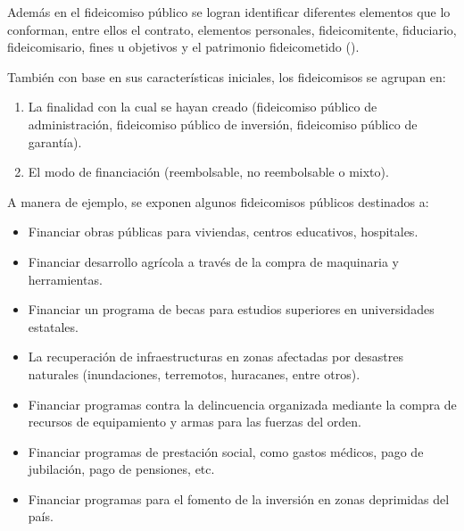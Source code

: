 \documentclass[preprint,floatfix] {revtex4}
\begin{document}
            Además en el fideicomiso público se logran identificar diferentes elementos que lo conforman, entre ellos el contrato, elementos personales, fideicomitente, fiduciario, fideicomisario, fines u objetivos y el patrimonio fideicometido (\cite{fideicomisopublico-victoria}).
            
            También con base en sus características iniciales, los fideicomisos se agrupan en:
            \begin{enumerate}
                \item La finalidad con la cual se hayan creado (fideicomiso público de administración, fideicomiso público de inversión, fideicomiso público de garantía).
                \item El modo de financiación (reembolsable, no reembolsable o mixto).
            \end{enumerate}
            
            A manera de ejemplo, se exponen algunos fideicomisos públicos destinados a:
            \begin{itemize}
                \item Financiar obras públicas para viviendas, centros educativos, hospitales.
                \item Financiar desarrollo agrícola a través de la compra de maquinaria y herramientas.
                \item Financiar un programa de becas para estudios superiores en universidades estatales.
                \item La recuperación de infraestructuras en zonas afectadas por desastres naturales (inundaciones, terremotos, huracanes, entre otros).
                \item Financiar programas contra la delincuencia organizada mediante la compra de recursos de equipamiento y armas para las fuerzas del orden.
                \item  Financiar programas de prestación social, como gastos médicos, pago de jubilación, pago de pensiones, etc.
                \item Financiar programas para el fomento de la inversión en zonas deprimidas del país.
            \end{itemize}
            

    \printbibliography
\end{document}
